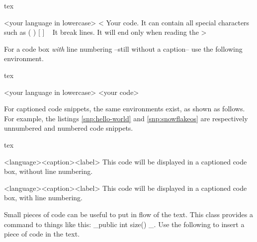 \documentclass[
	raggedright,
	12pt,
	colorful,
]{tufte-style-article}
\begin{document}
%
\begin{altcodebox}{tex}
\begin{codebox}{<your language in lowercase>}
<
Your code. It can contain all special characters such as { } ( ) [ ] \ %
It break lines.
It will end only when reading the %
>
\end{codebox}
\end{altcodebox}

For a code box \textit{with} line numbering --still without a caption-- use the following environment.
\begin{altcodebox}{tex}
\begin{codeboxnum}{<your language in lowercase>}
<your code>
\end{codeboxnum}
\end{altcodebox}

For captioned code snippets, the same environments exist, as shown as follows. For example, the listings \ref{snp:hello-world} and \ref{snp:snowflakeos} are respectively unnumbered and numbered code snippets.

\begin{codebox}{tex}
\begin{snippet}{<language>}{<caption>}{<label>}
This code will be displayed in a captioned code box, without line numbering.
\end{snippet}

\begin{snippetnum}{<language>}{<caption>}{<label>}
This code will be displayed in a captioned code box, with line numbering.
\end{snippetnum}
\end{codebox}

Small pieces of code can be useful to put in flow of the text. This class provides a command to things like this: _public int size() {}_. Use the following to insert a piece of code in the text.
\end{document}
